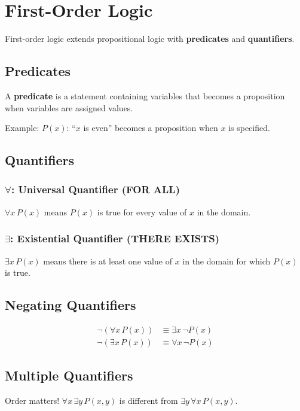 \documentclass{report}
\begin{document}
\section{First-Order Logic}

First-order logic extends propositional logic with \textbf{predicates} and \textbf{quantifiers}.

\subsection{Predicates}

A \textbf{predicate} is a statement containing variables that becomes a proposition when variables are assigned values.

Example: $P(x)$: ``$x$ is even'' becomes a proposition when $x$ is specified.

\subsection{Quantifiers}

\subsubsection{$\forall$: Universal Quantifier (FOR ALL)}
$\forall x \, P(x)$ means $P(x)$ is true for every value of $x$ in the domain.

\subsubsection{$\exists$: Existential Quantifier (THERE EXISTS)}
$\exists x \, P(x)$ means there is at least one value of $x$ in the domain for which $P(x)$ is true.

\subsection{Negating Quantifiers}

\begin{align}
    \neg(\forall x \, P(x)) &\equiv \exists x \, \neg P(x) \\
    \neg(\exists x \, P(x)) &\equiv \forall x \, \neg P(x)
\end{align}

\subsection{Multiple Quantifiers}

Order matters! $\forall x \, \exists y \, P(x, y)$ is different from $\exists y \, \forall x \, P(x, y)$.
\end{document}
